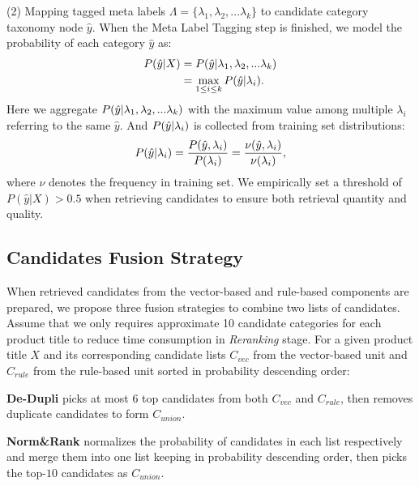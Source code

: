 (2) Mapping tagged meta labels $\Lambda=\{\lambda_1, \lambda_2, ... \lambda_k\}$ to candidate category taxonomy node $\hat{y}$.
When the Meta Label Tagging step is finished, we model the probability of each category $\hat{y}$ as:
\begin{equation}
    \begin{aligned}
    P(\hat{y} | X) &= P(\hat{y} \space | \space \lambda_1, \lambda_2, ... \lambda_k) \\ &= \max_{1 \leq i \leq k} P(\hat{y} \space | \space \lambda_i).
    \end{aligned}
\end{equation}
Here we aggregate $P(\hat{y} \space | \space \lambda_1, \lambda_2, ... \lambda_k)$ with the maximum value among multiple $\lambda_i$ referring to the same $\hat{y}$. And $P(\hat{y} \space | \space \lambda_i)$ is collected from training set distributions:
\begin{equation}
P(\hat{y} \space | \space \lambda_i) = \frac{P(\hat{y} \space , \space \lambda_i)}{P({\lambda_i})} = \frac{\nu(\hat{y} \space , \space \lambda_i)}{\nu({\lambda_i})},
\end{equation}
where $\nu$ denotes the frequency in training set. We empirically set a threshold of $P(\hat{y} | X) > 0.5$ when retrieving candidates to ensure both retrieval quantity and quality. 
\subsection{Candidates Fusion Strategy}
When retrieved candidates from the vector-based and rule-based components are prepared, we propose three fusion strategies to combine two lists of candidates. Assume that we only requires approximate 10 candidate categories for each product title to reduce time consumption in \textit{Reranking} stage. For a given product title $X$ and its corresponding candidate lists ${C_{vec}}$ from the vector-based unit and ${C_{rule}}$ from the rule-based unit sorted in probability descending order:

\noindent\textbf{De-Dupli} picks at most 6 top candidates from both ${C_{vec}}$ and ${C_{rule}}$, then removes 
duplicate candidates
to form $C_{union}$.

\noindent\textbf{Norm\&Rank} normalizes the probability of candidates in each list respectively and merge them into one list keeping in probability descending order, then picks the top-$10$ candidates as $C_{union}$.

